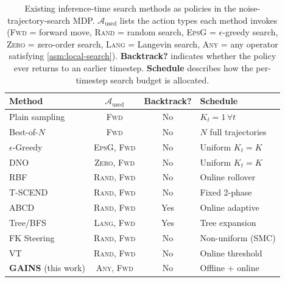 \begin{table}[t]
\centering
\caption{Existing inference-time search methods as policies in the noise-trajectory-search MDP. $\mathcal{A}_{\text{used}}$ lists the action types each method invokes (\textsc{Fwd} = forward move, \textsc{Rand} = random search, \textsc{EpsG} = $\epsilon$-greedy search, \textsc{Zero} = zero-order search, \textsc{Lang} = Langevin search, \textsc{Any} = any operator satisfying \cref{asm:local-search}). \textbf{Backtrack?} indicates whether the policy ever returns to an earlier timestep. \textbf{Schedule} describes how the per-timestep search budget is allocated.}
\label{tab:mdp_policies}
\small
\begin{tabular}{lccl}
\toprule
\textbf{Method} & $\mathcal{A}_{\text{used}}$ & \textbf{Backtrack?} & \textbf{Schedule} \\
\midrule
Plain sampling & \textsc{Fwd} & No & $K_t=1\,\forall t$ \\
Best-of-$N$~\citep{ma2024inference} & \textsc{Fwd} & No & $N$ full trajectories \\
$\epsilon$-Greedy~\citep{ramesh2025nts} & \textsc{EpsG, Fwd} & No & Uniform $K_t=K$ \\
DNO~\citep{tang2024dno} & \textsc{Zero, Fwd} & No & Uniform $K_t=K$ \\
RBF~\citep{kim2025rbf} & \textsc{Rand, Fwd} & No & Online rollover \\
T-SCEND~\citep{zhang2025tscend} & \textsc{Rand, Fwd} & No & Fixed 2-phase \\
ABCD~\citep{lee2025abcd} & \textsc{Rand, Fwd} & Yes & Online adaptive \\
Tree/BFS~\citep{zhang2025classical} & \textsc{Lang, Fwd} & Yes & Tree expansion \\
FK Steering~\citep{singhal2025fk} & \textsc{Rand, Fwd} & No & Non-uniform (SMC) \\
VT~\citep{sundaresha2025vt} & \textsc{Rand, Fwd} & No & Online threshold \\
\midrule
\textbf{\textsc{GAINS}} (this work) & \textsc{Any, Fwd} & No & Offline + online \\
\bottomrule
\end{tabular}
\end{table}

